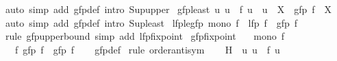 \begin{isabellebody}
\ {\isacharparenleft}{\kern0pt}auto\ simp\ add{\isacharcolon}{\kern0pt}\ gfp{\isacharunderscore}{\kern0pt}def\ intro{\isacharcolon}{\kern0pt}\ Sup{\isacharunderscore}{\kern0pt}upper{\isacharparenright}{\kern0pt}%
\endisatagproof
{\isafoldproof}%
%
\isadelimproof
\isanewline
%
\endisadelimproof
\isanewline
{}\isamarkupfalse%
\ gfp{\isacharunderscore}{\kern0pt}least{\isacharcolon}{\kern0pt}\ {\isachardoublequoteopen}{\isacharparenleft}{\kern0pt}{\isasymAnd}u{\isachardot}{\kern0pt}\ u\ {\isasymle}\ f\ u\ {\isasymLongrightarrow}\ u\ {\isasymle}\ X{\isacharparenright}{\kern0pt}\ {\isasymLongrightarrow}\ gfp\ f\ {\isasymle}\ X{\isachardoublequoteclose}\isanewline
%
\isadelimproof
\ \ %
\endisadelimproof
%
\isatagproof
{}\isamarkupfalse%
\ {\isacharparenleft}{\kern0pt}auto\ simp\ add{\isacharcolon}{\kern0pt}\ gfp{\isacharunderscore}{\kern0pt}def\ intro{\isacharcolon}{\kern0pt}\ Sup{\isacharunderscore}{\kern0pt}least{\isacharparenright}{\kern0pt}%
\endisatagproof
{\isafoldproof}%
%
\isadelimproof
\isanewline
%
\endisadelimproof
\isanewline
{}\isamarkupfalse%
\isanewline
\isanewline
{}\isamarkupfalse%
\ lfp{\isacharunderscore}{\kern0pt}le{\isacharunderscore}{\kern0pt}gfp{\isacharcolon}{\kern0pt}\ {\isachardoublequoteopen}mono\ f\ {\isasymLongrightarrow}\ lfp\ f\ {\isasymle}\ gfp\ f{\isachardoublequoteclose}\isanewline
%
\isadelimproof
\ \ %
\endisadelimproof
%
\isatagproof
{}\isamarkupfalse%
\ {\isacharparenleft}{\kern0pt}rule\ gfp{\isacharunderscore}{\kern0pt}upperbound{\isacharparenright}{\kern0pt}\ {\isacharparenleft}{\kern0pt}simp\ add{\isacharcolon}{\kern0pt}\ lfp{\isacharunderscore}{\kern0pt}fixpoint{\isacharparenright}{\kern0pt}%
\endisatagproof
{\isafoldproof}%
%
\isadelimproof
\isanewline
%
\endisadelimproof
\isanewline
{}\isamarkupfalse%
\ gfp{\isacharunderscore}{\kern0pt}fixpoint{\isacharcolon}{\kern0pt}\isanewline
\ \ \ {\isachardoublequoteopen}mono\ f{\isachardoublequoteclose}\isanewline
\ \ \ {\isachardoublequoteopen}f\ {\isacharparenleft}{\kern0pt}gfp\ f{\isacharparenright}{\kern0pt}\ {\isacharequal}{\kern0pt}\ gfp\ f{\isachardoublequoteclose}\isanewline
%
\isadelimproof
\ \ %
\endisadelimproof
%
\isatagproof
{}\isamarkupfalse%
\ gfp{\isacharunderscore}{\kern0pt}def\isanewline
{}\isamarkupfalse%
\ {\isacharparenleft}{\kern0pt}rule\ order{\isacharunderscore}{\kern0pt}antisym{\isacharparenright}{\kern0pt}\isanewline
\ \ \isamarkupfalse%
\ {\isacharquery}{\kern0pt}H\ {\isacharequal}{\kern0pt}\ {\isachardoublequoteopen}{\isacharbraceleft}{\kern0pt}u{\isachardot}{\kern0pt}\ u\ {\isasymle}\ f\ u{\isacharbraceright}{\kern0pt}{\isachardoublequoteclose}\isanewline

\end{isabellebody}
